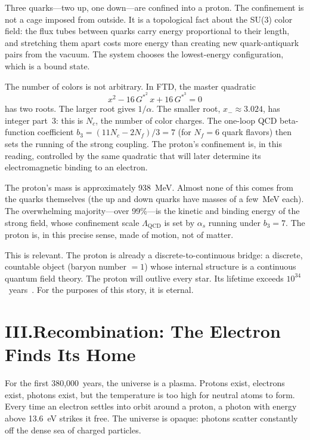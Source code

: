 \documentclass[11pt,a4paper]{article}
\newcommand{\Gstar}{G^{*}}
\begin{document}
Three quarks---two up, one down---are confined into a proton.  The
confinement is not a cage imposed from outside.  It is a topological fact
about the SU(3) color field: the flux tubes between quarks carry energy
proportional to their length, and stretching them apart costs more energy
than creating new quark-antiquark pairs from the vacuum.  The system chooses
the lowest-energy configuration, which is a bound state.

The number of colors is not arbitrary.  In FTD, the master quadratic
\[
x^2 - 16\,\Gstar^2\,x + 16\,\Gstar^3 = 0
\]
has two roots.  The larger root gives $1/\alpha$.  The smaller root,
$x_-\approx 3.024$, has integer part~3: this is $N_c$, the number of color
charges.  The one-loop QCD beta-function coefficient
$b_3=(11N_c-2N_f)/3=7$ (for $N_f=6$ quark flavors) then sets the running
of the strong coupling.  The proton's confinement is, in this reading,
controlled by the same quadratic that will later determine its
electromagnetic binding to an electron.

The proton's mass is approximately 938~MeV\@.  Almost none of this comes
from the quarks themselves (the up and down quarks have masses of a few~MeV
each).  The overwhelming majority---over 99\%---is the kinetic and binding
energy of the strong field, whose confinement scale
$\Lambda_{\text{QCD}}$ is set by $\alpha_s$ running under $b_3=7$.
The proton is, in this precise sense, made of motion, not of matter.

This is relevant.  The proton is already a discrete-to-continuous bridge: a
discrete, countable object (baryon number $=1$) whose internal structure is
a continuous quantum field theory.  The proton will outlive every star.  Its
lifetime exceeds $10^{34}$~years~\cite{superK}.  For the purposes of this
story, it is eternal.

\section*{III.\quad Recombination: The Electron Finds Its Home}

For the first 380,000~years, the universe is a plasma.  Protons exist,
electrons exist, photons exist, but the temperature is too high for neutral
atoms to form.  Every time an electron settles into orbit around a proton, a
photon with energy above 13.6~eV strikes it free.  The universe is opaque:
photons scatter constantly off the dense sea of charged particles.
\end{document}
